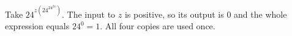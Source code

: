 Take $\boxed{24^{z(24^{24^{24}})}}$. The input to $z$ is positive, so its output is $0$ and the whole expression equals $24^0=1$. All four copies are used once.
